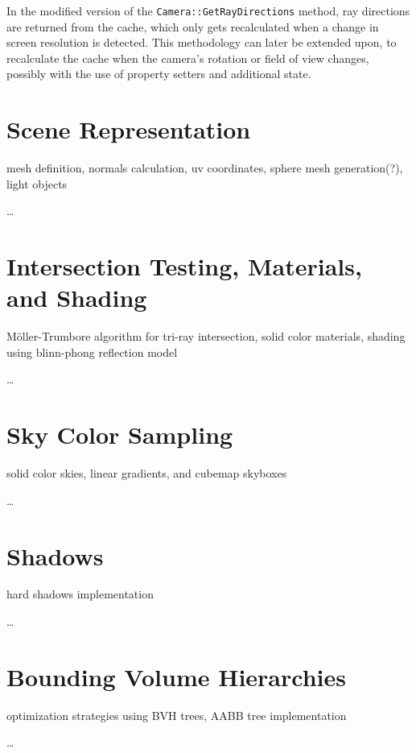 In the modified version of the \verb|Camera::GetRayDirections| method, ray directions are returned from the cache, which only gets recalculated when a change in screen resolution is detected.
This methodology can later be extended upon, to recalculate the cache when the camera's rotation or field of view changes, possibly with the use of property setters and additional state.  

\section{Scene Representation}

mesh definition, normals calculation, uv coordinates, sphere mesh generation(?), light objects

\dots

\section{Intersection Testing, Materials, and Shading}

Möller-Trumbore algorithm for tri-ray intersection, solid color materials, shading using blinn-phong reflection model

\dots

\section{Sky Color Sampling}

solid color skies, linear gradients, and cubemap skyboxes

\dots

\section{Shadows}

hard shadows implementation

\dots

\section{Bounding Volume Hierarchies}

optimization strategies using BVH trees, AABB tree implementation

\dots
